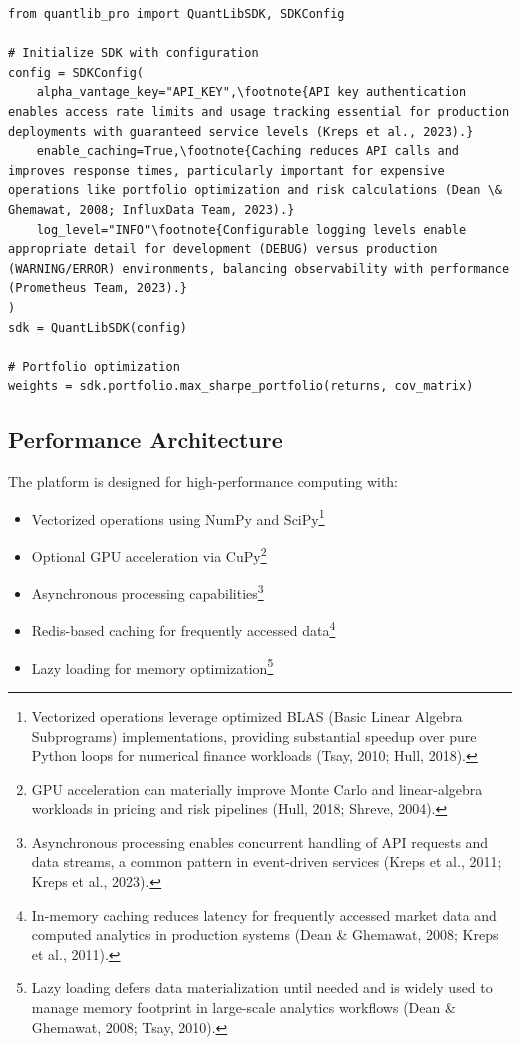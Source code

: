 \documentclass[12pt,a4paper]{article}
\theoremstyle{definition}
\theoremstyle{remark}
\begin{document}
\begin{lstlisting}[caption=SDK Usage Example]
from quantlib_pro import QuantLibSDK, SDKConfig

# Initialize SDK with configuration
config = SDKConfig(
    alpha_vantage_key="API_KEY",\footnote{API key authentication enables access rate limits and usage tracking essential for production deployments with guaranteed service levels (Kreps et al., 2023).}
    enable_caching=True,\footnote{Caching reduces API calls and improves response times, particularly important for expensive operations like portfolio optimization and risk calculations (Dean \& Ghemawat, 2008; InfluxData Team, 2023).}
    log_level="INFO"\footnote{Configurable logging levels enable appropriate detail for development (DEBUG) versus production (WARNING/ERROR) environments, balancing observability with performance (Prometheus Team, 2023).}
)
sdk = QuantLibSDK(config)

# Portfolio optimization
weights = sdk.portfolio.max_sharpe_portfolio(returns, cov_matrix)
\end{lstlisting}

\subsection{Performance Architecture}

The platform is designed for high-performance computing with:
\begin{itemize}
    \item Vectorized operations using NumPy and SciPy\footnote{Vectorized operations leverage optimized BLAS (Basic Linear Algebra Subprograms) implementations, providing substantial speedup over pure Python loops for numerical finance workloads (Tsay, 2010; Hull, 2018).}
    \item Optional GPU acceleration via CuPy\footnote{GPU acceleration can materially improve Monte Carlo and linear-algebra workloads in pricing and risk pipelines (Hull, 2018; Shreve, 2004).}
    \item Asynchronous processing capabilities\footnote{Asynchronous processing enables concurrent handling of API requests and data streams, a common pattern in event-driven services (Kreps et al., 2011; Kreps et al., 2023).}
    \item Redis-based caching for frequently accessed data\footnote{In-memory caching reduces latency for frequently accessed market data and computed analytics in production systems (Dean \& Ghemawat, 2008; Kreps et al., 2011).}
    \item Lazy loading for memory optimization\footnote{Lazy loading defers data materialization until needed and is widely used to manage memory footprint in large-scale analytics workflows (Dean \& Ghemawat, 2008; Tsay, 2010).}
\end{itemize}
\end{document}
